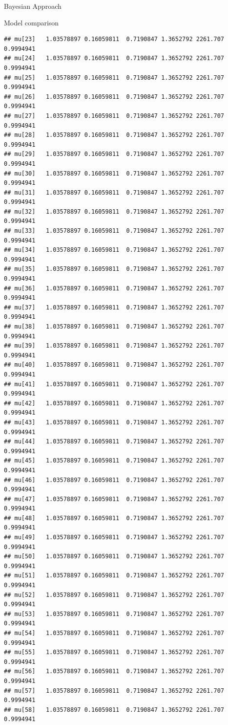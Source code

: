 \documentclass[
  ignorenonframetext,
]{beamer}
\begin{document}
\begin{frame}[fragile]{Bayesian Approach}
\begin{block}{Model comparison}
\begin{verbatim}
## mu[23]   1.03578897 0.16059811  0.7190847 1.3652792 2261.707 0.9994941
## mu[24]   1.03578897 0.16059811  0.7190847 1.3652792 2261.707 0.9994941
## mu[25]   1.03578897 0.16059811  0.7190847 1.3652792 2261.707 0.9994941
## mu[26]   1.03578897 0.16059811  0.7190847 1.3652792 2261.707 0.9994941
## mu[27]   1.03578897 0.16059811  0.7190847 1.3652792 2261.707 0.9994941
## mu[28]   1.03578897 0.16059811  0.7190847 1.3652792 2261.707 0.9994941
## mu[29]   1.03578897 0.16059811  0.7190847 1.3652792 2261.707 0.9994941
## mu[30]   1.03578897 0.16059811  0.7190847 1.3652792 2261.707 0.9994941
## mu[31]   1.03578897 0.16059811  0.7190847 1.3652792 2261.707 0.9994941
## mu[32]   1.03578897 0.16059811  0.7190847 1.3652792 2261.707 0.9994941
## mu[33]   1.03578897 0.16059811  0.7190847 1.3652792 2261.707 0.9994941
## mu[34]   1.03578897 0.16059811  0.7190847 1.3652792 2261.707 0.9994941
## mu[35]   1.03578897 0.16059811  0.7190847 1.3652792 2261.707 0.9994941
## mu[36]   1.03578897 0.16059811  0.7190847 1.3652792 2261.707 0.9994941
## mu[37]   1.03578897 0.16059811  0.7190847 1.3652792 2261.707 0.9994941
## mu[38]   1.03578897 0.16059811  0.7190847 1.3652792 2261.707 0.9994941
## mu[39]   1.03578897 0.16059811  0.7190847 1.3652792 2261.707 0.9994941
## mu[40]   1.03578897 0.16059811  0.7190847 1.3652792 2261.707 0.9994941
## mu[41]   1.03578897 0.16059811  0.7190847 1.3652792 2261.707 0.9994941
## mu[42]   1.03578897 0.16059811  0.7190847 1.3652792 2261.707 0.9994941
## mu[43]   1.03578897 0.16059811  0.7190847 1.3652792 2261.707 0.9994941
## mu[44]   1.03578897 0.16059811  0.7190847 1.3652792 2261.707 0.9994941
## mu[45]   1.03578897 0.16059811  0.7190847 1.3652792 2261.707 0.9994941
## mu[46]   1.03578897 0.16059811  0.7190847 1.3652792 2261.707 0.9994941
## mu[47]   1.03578897 0.16059811  0.7190847 1.3652792 2261.707 0.9994941
## mu[48]   1.03578897 0.16059811  0.7190847 1.3652792 2261.707 0.9994941
## mu[49]   1.03578897 0.16059811  0.7190847 1.3652792 2261.707 0.9994941
## mu[50]   1.03578897 0.16059811  0.7190847 1.3652792 2261.707 0.9994941
## mu[51]   1.03578897 0.16059811  0.7190847 1.3652792 2261.707 0.9994941
## mu[52]   1.03578897 0.16059811  0.7190847 1.3652792 2261.707 0.9994941
## mu[53]   1.03578897 0.16059811  0.7190847 1.3652792 2261.707 0.9994941
## mu[54]   1.03578897 0.16059811  0.7190847 1.3652792 2261.707 0.9994941
## mu[55]   1.03578897 0.16059811  0.7190847 1.3652792 2261.707 0.9994941
## mu[56]   1.03578897 0.16059811  0.7190847 1.3652792 2261.707 0.9994941
## mu[57]   1.03578897 0.16059811  0.7190847 1.3652792 2261.707 0.9994941
## mu[58]   1.03578897 0.16059811  0.7190847 1.3652792 2261.707 0.9994941

\end{verbatim}
\end{block}
\end{frame}
\end{document}
